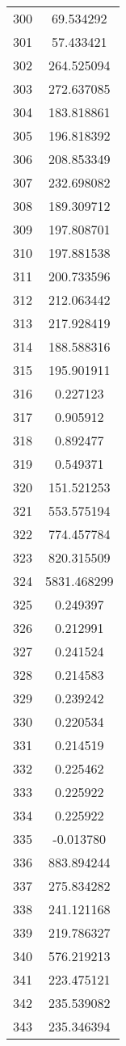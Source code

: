 \documentclass[12pt]{article}
\begin{document}
\begin{longtable}{@{}cc@{}}
300 & 69.534292 \\
301 & 57.433421 \\
302 & 264.525094 \\
303 & 272.637085 \\
304 & 183.818861 \\
305 & 196.818392 \\
306 & 208.853349 \\
307 & 232.698082 \\
308 & 189.309712 \\
309 & 197.808701 \\
310 & 197.881538 \\
311 & 200.733596 \\
312 & 212.063442 \\
313 & 217.928419 \\
314 & 188.588316 \\
315 & 195.901911 \\
316 & 0.227123 \\
317 & 0.905912 \\
318 & 0.892477 \\
319 & 0.549371 \\
320 & 151.521253 \\
321 & 553.575194 \\
322 & 774.457784 \\
323 & 820.315509 \\
324 & 5831.468299 \\
325 & 0.249397 \\
326 & 0.212991 \\
327 & 0.241524 \\
328 & 0.214583 \\
329 & 0.239242 \\
330 & 0.220534 \\
331 & 0.214519 \\
332 & 0.225462 \\
333 & 0.225922 \\
334 & 0.225922 \\
335 & -0.013780 \\
336 & 883.894244 \\
337 & 275.834282 \\
338 & 241.121168 \\
339 & 219.786327 \\
340 & 576.219213 \\
341 & 223.475121 \\
342 & 235.539082 \\
343 & 235.346394 \\

\end{longtable}
\end{document}
